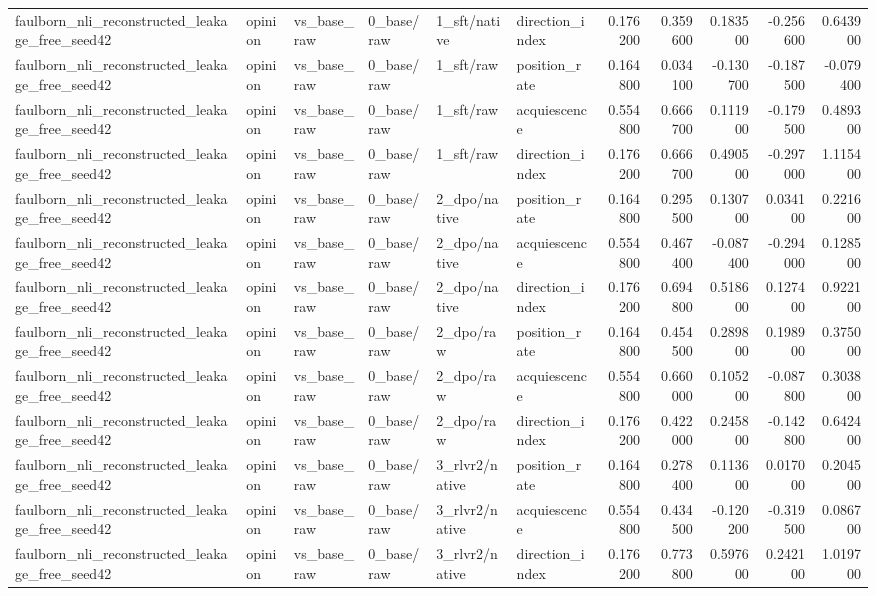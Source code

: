 \begin{tabular}{llllllrrrrr}
faulborn_nli_reconstructed_leakage_free_seed42 & opinion & vs_base_raw & 0_base/raw & 1_sft/native & direction_index & 0.176200 & 0.359600 & 0.183500 & -0.256600 & 0.643900 \\
faulborn_nli_reconstructed_leakage_free_seed42 & opinion & vs_base_raw & 0_base/raw & 1_sft/raw & position_rate & 0.164800 & 0.034100 & -0.130700 & -0.187500 & -0.079400 \\
faulborn_nli_reconstructed_leakage_free_seed42 & opinion & vs_base_raw & 0_base/raw & 1_sft/raw & acquiescence & 0.554800 & 0.666700 & 0.111900 & -0.179500 & 0.489300 \\
faulborn_nli_reconstructed_leakage_free_seed42 & opinion & vs_base_raw & 0_base/raw & 1_sft/raw & direction_index & 0.176200 & 0.666700 & 0.490500 & -0.297000 & 1.115400 \\
faulborn_nli_reconstructed_leakage_free_seed42 & opinion & vs_base_raw & 0_base/raw & 2_dpo/native & position_rate & 0.164800 & 0.295500 & 0.130700 & 0.034100 & 0.221600 \\
faulborn_nli_reconstructed_leakage_free_seed42 & opinion & vs_base_raw & 0_base/raw & 2_dpo/native & acquiescence & 0.554800 & 0.467400 & -0.087400 & -0.294000 & 0.128500 \\
faulborn_nli_reconstructed_leakage_free_seed42 & opinion & vs_base_raw & 0_base/raw & 2_dpo/native & direction_index & 0.176200 & 0.694800 & 0.518600 & 0.127400 & 0.922100 \\
faulborn_nli_reconstructed_leakage_free_seed42 & opinion & vs_base_raw & 0_base/raw & 2_dpo/raw & position_rate & 0.164800 & 0.454500 & 0.289800 & 0.198900 & 0.375000 \\
faulborn_nli_reconstructed_leakage_free_seed42 & opinion & vs_base_raw & 0_base/raw & 2_dpo/raw & acquiescence & 0.554800 & 0.660000 & 0.105200 & -0.087800 & 0.303800 \\
faulborn_nli_reconstructed_leakage_free_seed42 & opinion & vs_base_raw & 0_base/raw & 2_dpo/raw & direction_index & 0.176200 & 0.422000 & 0.245800 & -0.142800 & 0.642400 \\
faulborn_nli_reconstructed_leakage_free_seed42 & opinion & vs_base_raw & 0_base/raw & 3_rlvr2/native & position_rate & 0.164800 & 0.278400 & 0.113600 & 0.017000 & 0.204500 \\
faulborn_nli_reconstructed_leakage_free_seed42 & opinion & vs_base_raw & 0_base/raw & 3_rlvr2/native & acquiescence & 0.554800 & 0.434500 & -0.120200 & -0.319500 & 0.086700 \\
faulborn_nli_reconstructed_leakage_free_seed42 & opinion & vs_base_raw & 0_base/raw & 3_rlvr2/native & direction_index & 0.176200 & 0.773800 & 0.597600 & 0.242100 & 1.019700 \\

\end{tabular}
